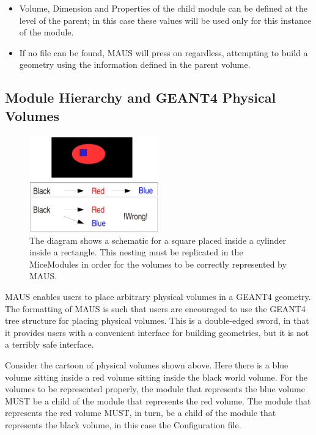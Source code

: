 \liststyleLi
\begin{itemize}
\item Volume, Dimension and Properties of the child module can be defined at the level of the parent; in this case these
values will be used only for this instance of the module.
\end{itemize}
\liststyleLii
\begin{itemize}
\item If no file can be found, MAUS will press on regardless, attempting to build a geometry using the information
defined in the parent volume.
\end{itemize}
\subsection[Module Hierarchy and GEANT4 Physical Volumes]{Module Hierarchy and GEANT4 Physical Volumes}
\begin{figure}[!htb]
\begin{center}
\includegraphics[width=0.5\textwidth]{mice_modules/volume_hierarchy.png}
\caption{The diagram shows a schematic for a square placed inside a cylinder inside a rectangle. This nesting must be replicated
         in the MiceModules in order for the volumes to be correctly represented by MAUS.}
\end{center}
\end{figure}
MAUS enables users to place arbitrary physical volumes in a GEANT4 geometry. The
formatting of MAUS is such that users are encouraged to use the GEANT4 tree structure for placing physical volumes.
This is a double-edged sword, in that it provides users with a convenient interface for building geometries, but it is
not a terribly safe interface.

Consider the cartoon of physical volumes shown above. Here there is a blue volume sitting inside a red volume sitting
inside the black world volume. For the volumes to be represented properly, the module that represents the blue volume
MUST be a child of the module that represents the red volume. The module that represents the red volume MUST, in turn,
be a child of the module that represents the black volume, in this case the Configuration file.

